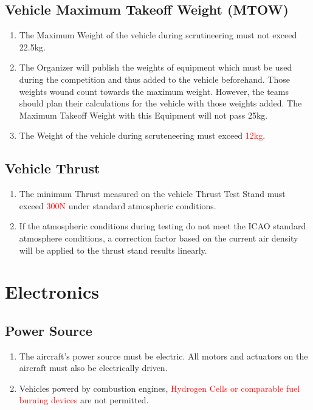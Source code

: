 \documentclass{article}
\begin{document}
\subsection{Vehicle Maximum Takeoff Weight (MTOW)}
\begin{enumerate}
  \item The Maximum Weight of the vehicle during scrutineering must not exceed 22.5kg.
  \item The Organizer will publish the weights of equipment which must be used during the competition and thus added to the vehicle beforehand. Those weights wound count towards the maximum weight. 
  However, the teams should plan their calculations for the vehicle with those weights added. The Maximum Takeoff Weight with this Equipment will not pass 25kg.  
  \item The Weight of the vehicle during scruteneering must exceed \textcolor{red}{12kg}.  
\end{enumerate}

\subsection{Vehicle Thrust}
\begin{enumerate}
  \item The minimum Thrust measured on the vehicle Thrust Test Stand must exceed \textcolor{red}{300N} under standard atmospheric conditions.
  \item If the atmospheric conditions during testing do not meet the ICAO standard atmosphere conditions, a correction factor based on the current air density will be applied to the thrust stand results linearly.
\end{enumerate}


\section{Electronics}


\subsection{Power Source}
\begin{enumerate}
  \item The aircraft's power source must be electric. All motors and actuators on the aircraft must also be electrically driven.
  \item Vehicles powerd by combustion engines, \textcolor{red}{Hydrogen Cells or comparable fuel burning devices} are not permitted. 
\end{enumerate}
\end{document}
